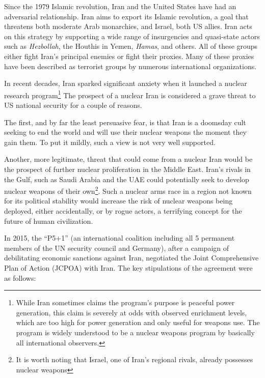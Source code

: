




\maketitle

Since the 1979 Islamic revolution, Iran and the United States have had an
adversarial relationship. Iran aims to export its Islamic revolution, a goal
that threatens both moderate Arab monarchies, and Israel, both US allies. Iran
acts on this strategy by supporting a wide range of insurgencies and quasi-state
actors such as \textit{Hezbollah}, the Houthis in Yemen, \textit{Hamas}, and
others. All of these groups either fight Iran's principal enemies or fight their
proxies. Many of these proxies have been described as terrorist groups by
numerous international organizations.

In recent decades, Iran sparked significant anxiety when it launched a nuclear
research program\footnote{While Iran sometimes claims the program's purpose is
peaceful power generation, this claim is severely at odds with observed
enrichment levels, which are too high for power generation and only useful for
weapons use. The program is widely understood to be a nuclear weapons program by
basically all international observers.} The prospect of a nuclear Iran is
considered a grave threat to US national security for a couple of reasons.

The first, and by far the least persuasive fear, is that Iran is a doomsday cult
seeking to end the world and will use their nuclear weapons the moment they gain
them. To put it mildly, such a view is not very well supported.

Another, more legitimate, threat that could come from a nuclear Iran would be
the prospect of further nuclear proliferation in the Middle East. Iran's rivals
in the Gulf, such as Saudi Arabia and the UAE could potentially seek to develop
nuclear weapons of their own\footnote{It is worth noting that Israel, one of
Iran's regional rivals, already possesses nuclear weapons}. Such a nuclear arms
race in a region not known for its political stability would increase the risk
of nuclear weapons being deployed, either accidentally, or by rogue actors, a
terrifying concept for the future of human civilization.

In 2015, the ``P5+1'' (an international coalition including all 5 permanent
members of the UN security council and Germany), after a campaign of
debilitating economic sanctions against Iran, negotiated the Joint Comprehensive
Plan of Action (JCPOA) with Iran. The key stipulations of the agreement were as
follows:

